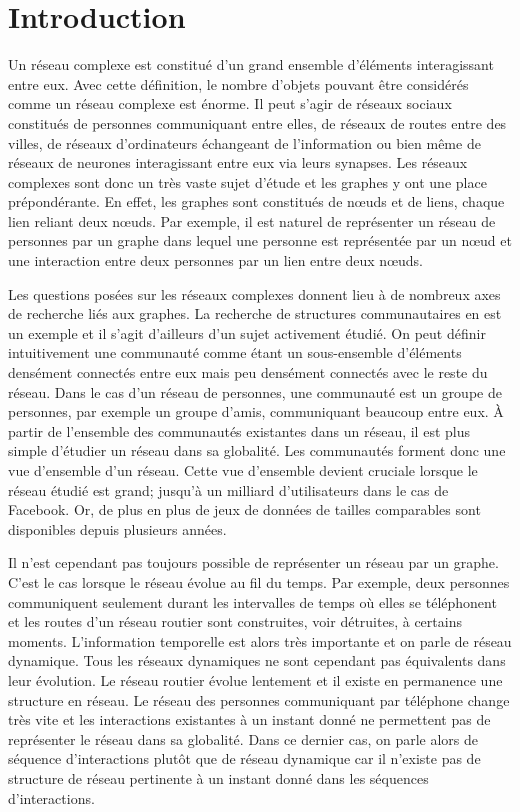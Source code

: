 
\chapter*{Introduction}

Un réseau complexe est constitué d'un grand ensemble d'éléments interagissant entre eux.
Avec cette définition, le nombre d'objets pouvant être considérés comme un réseau complexe est énorme.
Il peut s'agir de réseaux sociaux constitués de personnes communiquant entre elles, de réseaux de routes entre des villes, de réseaux d'ordinateurs échangeant de l'information ou bien même de réseaux de neurones interagissant entre eux via leurs synapses.
Les réseaux complexes sont donc un très vaste sujet d'étude et les graphes y ont une place prépondérante.
En effet, les graphes sont constitués de n\oe{}uds et de liens, chaque lien reliant deux n\oe{}uds.
Par exemple, il est naturel de représenter un réseau de personnes par un graphe dans lequel une personne est représentée par un n\oe{}ud et une interaction entre deux personnes par un lien entre deux n\oe{}uds.

Les questions posées sur les réseaux complexes donnent lieu à de nombreux axes de recherche liés aux graphes.
La recherche de structures communautaires en est un exemple et il s'agit d'ailleurs d'un sujet activement étudié.
On peut définir intuitivement une communauté comme étant un sous-ensemble d’éléments densément connectés entre eux mais peu densément connectés avec le reste du réseau.
Dans le cas d'un réseau de personnes, une communauté est un groupe de personnes, par exemple un groupe d'amis, communiquant beaucoup entre eux.
\`A partir de l'ensemble des communautés existantes dans un réseau, il est plus simple d'étudier un réseau dans sa globalité.
Les communautés forment donc une vue d'ensemble d'un réseau.
Cette vue d'ensemble devient cruciale lorsque le réseau étudié est grand; jusqu'à un milliard d'utilisateurs dans le cas de Facebook.
Or, de plus en plus de jeux de données de tailles comparables sont disponibles depuis plusieurs années.


Il n'est cependant pas toujours possible de représenter un réseau par un graphe.
C'est le cas lorsque le réseau évolue au fil du temps.
Par exemple, deux personnes communiquent seulement durant les intervalles de temps où elles se téléphonent et les routes d'un réseau routier sont construites, voir détruites, à certains moments.
L'information temporelle est alors très importante et on parle de réseau dynamique.
Tous les réseaux dynamiques ne sont cependant pas équivalents dans leur évolution.
Le réseau routier évolue lentement et il existe en permanence une structure en réseau.
Le réseau des personnes communiquant par téléphone change très vite et les interactions existantes à un instant donné ne permettent pas de représenter le réseau dans sa globalité.
Dans ce dernier cas, on parle alors de séquence d'interactions plutôt que de réseau dynamique car il n'existe pas de structure de réseau pertinente à un instant donné dans les séquences d'interactions.


